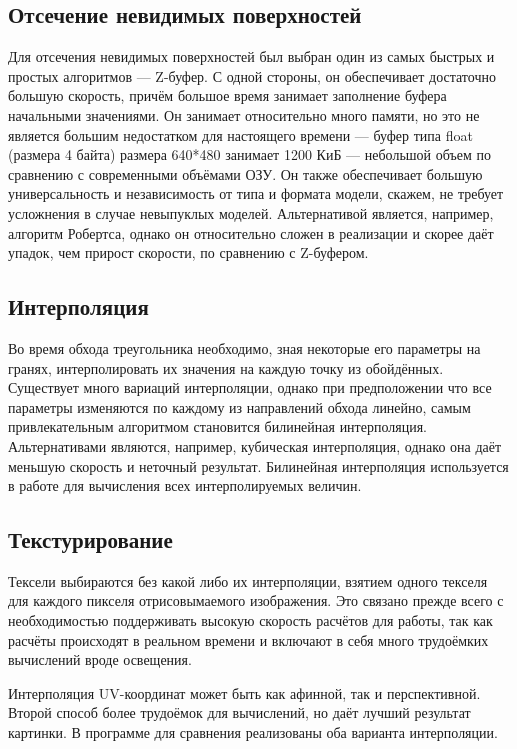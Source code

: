 \documentclass[a4paper,12pt]{report}
\begin{document}
\subsection{Отсечение невидимых поверхностей}
Для отсечения невидимых поверхностей был выбран один из самых быстрых и простых алгоритмов --- Z-буфер. С одной стороны, он обеспечивает достаточно большую скорость, причём большое время занимает заполнение буфера начальными значениями. Он занимает относительно много памяти, но это не является большим недостатком для настоящего времени --- буфер типа float (размера 4 байта) размера 640*480 занимает 1200 КиБ --- небольшой объем по сравнению с современными объёмами ОЗУ. Он также обеспечивает большую универсальность и независимость от типа и формата модели, скажем, не требует усложнения в случае невыпуклых моделей. Альтернативой является, например, алгоритм Робертса, однако он относительно сложен в реализации и скорее даёт упадок, чем прирост скорости, по сравнению с Z-буфером.


\subsection{Интерполяция}
Во время обхода треугольника необходимо, зная некоторые его параметры на гранях, интерполировать их значения на каждую точку из обойдённых. Существует много вариаций интерполяции, однако при предположении что все параметры изменяются по каждому из направлений обхода линейно, самым привлекательным алгоритмом становится билинейная интерполяция. Альтернативами являются, например, кубическая интерполяция, однако она даёт меньшую скорость и неточный результат. Билинейная интерполяция используется в работе для вычисления всех интерполируемых величин.

\subsection{Текстурирование}
Тексели выбираются без какой либо их интерполяции, взятием одного текселя для каждого пикселя отрисовымаемого изображения. Это связано прежде всего с необходимостью поддерживать высокую скорость расчётов для работы, так как расчёты происходят в реальном времени и включают в себя много трудоёмких вычислений вроде освещения.

Интерполяция UV-координат может быть как афинной, так и перспективной. Второй способ более трудоёмок для вычислений, но даёт лучший результат картинки. В программе для сравнения реализованы оба варианта интерполяции.
\end{document}
